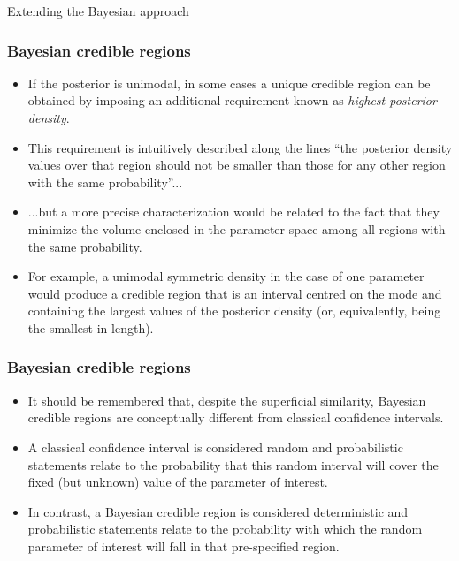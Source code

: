 \documentclass[10pt]{beamer}
\theoremstyle{definition}
\begin{document}
\begin{section}{Extending the Bayesian approach}
\begin{frame}[fragile]
\frametitle{Bayesian credible regions}
\begin{itemize}\itemsep1em
\item If the posterior is unimodal, in some cases a unique credible region can be obtained by imposing an additional requirement known as \emph{highest posterior density}.
\item This requirement is intuitively described along the lines ``the posterior density values over that region should not be smaller than those for any other region with the same probability''...
\item ...but a more precise characterization would be related to the fact that they minimize the volume enclosed in the parameter space among all regions with the same probability.
\item For example, a unimodal symmetric density in the case of one parameter would produce a credible region that is an interval centred on the mode and containing the largest values of the posterior density (or, equivalently, being the smallest in length).
\end{itemize}
\end{frame}

\begin{frame}[fragile]
\frametitle{Bayesian credible regions}
\begin{itemize}\itemsep1em
\item It should be remembered that, despite the superficial similarity, Bayesian credible regions are conceptually different from classical confidence intervals.
\item A classical confidence interval is considered random and probabilistic statements relate to the probability that this random interval will cover the fixed (but unknown) value of the parameter of interest.
\item In contrast, a Bayesian credible region is considered deterministic and probabilistic statements relate to the probability with which the random parameter of interest will fall in that pre-specified region.
\end{itemize}
\end{frame}


\end{section}
\end{document}
